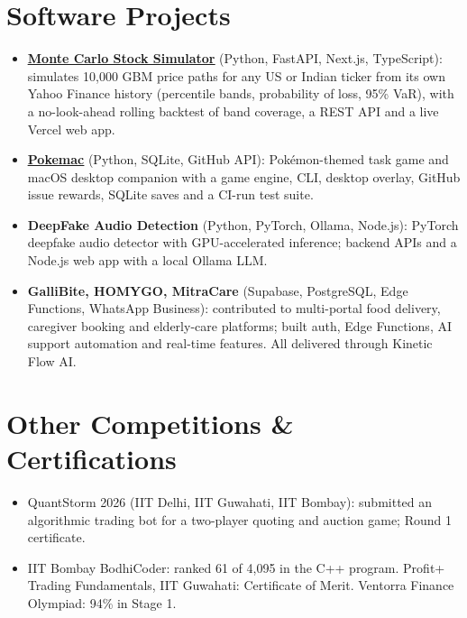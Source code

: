 \documentclass[letterpaper,10pt]{article}
\begin{document}
\section{Software Projects}
\begin{itemize}
  \item \href{https://github.com/Lnvqntx/Monte-Carlo-Stock-Sim}{\textbf{\underline{Monte Carlo Stock Simulator}}} (Python, FastAPI, Next.js, TypeScript): simulates 10,000
        GBM price paths for any US or Indian ticker from its own Yahoo Finance history (percentile bands, probability of loss,
        95\% VaR), with a no-look-ahead rolling backtest of band coverage, a REST API and a live Vercel web app.
  \item \href{https://github.com/Lnvqntx/Pokemac}{\textbf{\underline{Pokemac}}} (Python, SQLite, GitHub API): Pok\'emon-themed task game and macOS desktop companion
        with a game engine, CLI, desktop overlay, GitHub issue rewards, SQLite saves and a CI-run test suite.
  \item \textbf{DeepFake Audio Detection} (Python, PyTorch, Ollama, Node.js): PyTorch deepfake audio detector with
        GPU-accelerated inference; backend APIs and a Node.js web app with a local Ollama LLM.
  \item \textbf{GalliBite, HOMYGO, MitraCare} (Supabase, PostgreSQL, Edge Functions, WhatsApp Business): contributed to
        multi-portal food delivery, caregiver booking and elderly-care platforms; built auth, Edge Functions, AI support
        automation and real-time features. All delivered through Kinetic Flow AI.
\end{itemize}

\section{Other Competitions \& Certifications}
\begin{itemize}
  \item QuantStorm 2026 (IIT Delhi, IIT Guwahati, IIT Bombay): submitted an algorithmic trading bot for a two-player
        quoting and auction game; Round 1 certificate.
  \item IIT Bombay BodhiCoder: ranked 61 of 4,095 in the C++ program. Profit+ Trading Fundamentals, IIT
        Guwahati: Certificate of Merit. Ventorra Finance Olympiad: 94\% in Stage 1.
\end{itemize}

\end{document}
